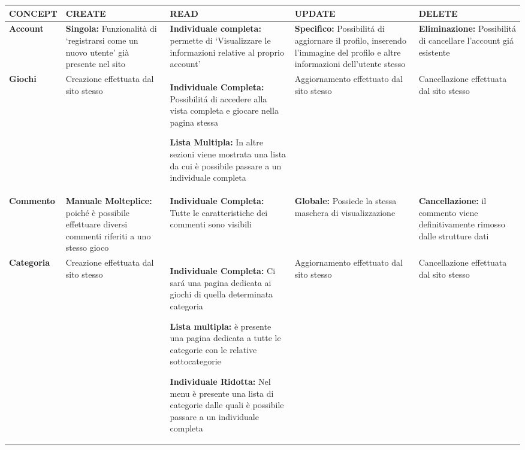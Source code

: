 \documentclass[../Report.tex]{subfiles}
\begin{document}
    \begin{table}[H]
        \hspace{-2.5cm}
        \begin{tabular}{|p{2.5cm}|p{3.5cm}|p{3.5cm}|p{3.5cm}|p{3.5cm}|}
            \hline
            \textbf{CONCEPT} & \textbf{CREATE} & \textbf{READ} & \textbf{UPDATE} & \textbf{DELETE} \\
            \hline
            \textbf{Account} & \cellcolor{gray} \textbf{Singola:} Funzionalità di ‘registrarsi come un nuovo utente’ già presente nel sito & \cellcolor{green} \textbf{Individuale completa:} permette di ‘Visualizzare le informazioni relative al proprio account’  & \cellcolor{green} \textbf{Specifico:} Possibilitá di aggiornare il profilo, inserendo l’immagine del profilo e altre informazioni dell’utente stesso & \cellcolor{gray} \textbf{Eliminazione:} Possibilitá di cancellare  l’account giá esistente \\
            \hline
            \textbf{Giochi} & \cellcolor{red} Creazione effettuata dal sito stesso & \cellcolor{green} \textbf{Individuale Completa:} Possibilitá di accedere alla vista completa e giocare nella pagina stessa

            \textbf{Lista Multipla:} In altre sezioni viene mostrata una lista da cui è possibile passare a un individuale completa
             & \cellcolor{red} Aggiornamento effettuato dal sito stesso & \cellcolor{red} Cancellazione effettuata dal sito stesso \\
            \hline
            \textbf{Commento} & \cellcolor{gray} \textbf{Manuale Molteplice:} poiché è possibile effettuare diversi commenti riferiti a uno stesso gioco & \cellcolor{gray} \textbf{Individuale Completa:} Tutte le caratteristiche dei commenti sono visibili & \cellcolor{gray} \textbf{Globale:} Possiede la stessa maschera di visualizzazione & \cellcolor{gray} \textbf{Cancellazione:} il commento viene definitivamente rimosso dalle strutture dati\\
            \hline
            \textbf{Categoria} & \cellcolor{red} Creazione effettuata dal sito stesso & \cellcolor{green} \textbf{Individuale Completa:} Ci sará una pagina dedicata ai giochi di quella determinata categoria

            \textbf{Lista multipla:} è presente una pagina dedicata a tutte le categorie con le relative sottocategorie
            
            \textbf{Individuale Ridotta:} Nel menu è presente una lista di categorie dalle quali è possibile passare a un individuale completa
            
             & \cellcolor{red} Aggiornamento effettuato dal sito stesso & \cellcolor{red} Cancellazione effettuata dal sito stesso \\
            \hline
        \end{tabular}
    \end{table}
\end{document}
